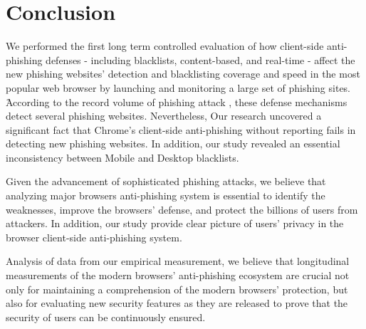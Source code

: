 \documentclass[letterpaper,twocolumn,10pt]{article}
\begin{document}


\section{Conclusion}




We performed the first long term controlled evaluation of how client-side anti-phishing defenses - including blacklists, content-based, and real-time - affect the new phishing websites' detection and blacklisting coverage and speed in the most popular web browser by launching and monitoring a large set of phishing sites. 
َAccording to the record volume of phishing attack \cite{APWG}, these defense mechanisms detect several phishing websites. Nevertheless, Our research uncovered a significant fact that Chrome's client-side anti-phishing without reporting fails in detecting new phishing websites. In addition, our study revealed an essential inconsistency between Mobile and Desktop blacklists. 

Given the advancement of sophisticated phishing attacks, we believe that analyzing major browsers anti-phishing system is essential to identify the weaknesses, improve the browsers' defense, and protect the billions of users from attackers. In addition, our study provide clear picture of users' privacy in the browser client-side anti-phishing system.

Analysis of data from our empirical measurement, we believe that longitudinal measurements of the modern browsers' anti-phishing ecosystem are crucial not only for maintaining a comprehension
of the modern browsers' protection, but also for
evaluating new security features as they are released to prove that the security of users can be continuously ensured.




\end{document}
